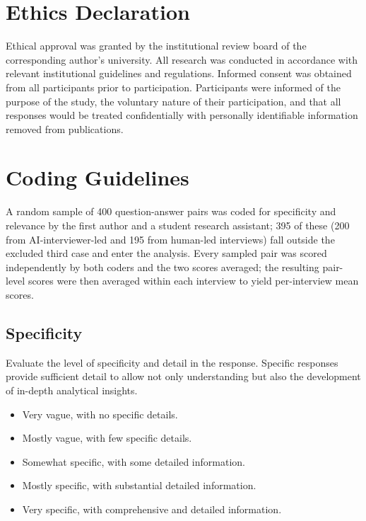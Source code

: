 \documentclass[12pt]{article}
\newcommand{\AII}{AI-interviewer}
\begin{document}
\section*{Ethics Declaration}

Ethical approval was granted by the institutional review board of the corresponding author's university. All research was conducted in accordance with relevant institutional guidelines and regulations. Informed consent was obtained from all participants prior to participation. Participants were informed of the purpose of the study, the voluntary nature of their participation, and that all responses would be treated confidentially with personally identifiable information removed from publications.




\newpage
\appendix

\section{Coding Guidelines}
\label{app:coding}

A random sample of 400 question-answer pairs was coded for specificity and relevance by the first author and a student research assistant; 395 of these (200 from \AII{}-led and 195 from human-led interviews) fall outside the excluded third case and enter the analysis. Every sampled pair was scored independently by both coders and the two scores averaged; the resulting pair-level scores were then averaged within each interview to yield per-interview mean scores.

\subsection*{Specificity}

Evaluate the level of specificity and detail in the response. Specific responses provide sufficient detail to allow not only understanding but also the development of in-depth analytical insights.

\begin{itemize}
  \item[1:] Very vague, with no specific details.
  \item[2:] Mostly vague, with few specific details.
  \item[3:] Somewhat specific, with some detailed information.
  \item[4:] Mostly specific, with substantial detailed information.
  \item[5:] Very specific, with comprehensive and detailed information.
\end{itemize}
\end{document}
